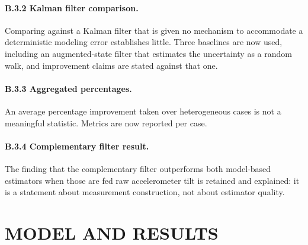 \paragraph{B.3.2 Kalman filter comparison.}
Comparing against a Kalman filter that is given no mechanism to accommodate a
deterministic modeling error establishes little. Three baselines are now used,
including an augmented-state filter that estimates the uncertainty as a random
walk, and improvement claims are stated against that one.

\paragraph{B.3.3 Aggregated percentages.}
An average percentage improvement taken over heterogeneous cases is not a
meaningful statistic. Metrics are now reported per case.

\paragraph{B.3.4 Complementary filter result.}
The finding that the complementary filter outperforms both model-based
estimators when those are fed raw accelerometer tilt is retained and explained:
it is a statement about measurement construction, not about estimator quality.

\section{MODEL AND RESULTS}

